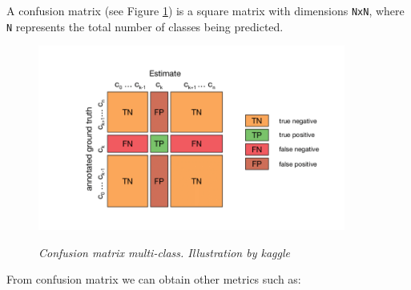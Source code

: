 A confusion matrix (see Figure \ref{fig:confusion-matrix}) is a square matrix
with dimensions {\tt NxN}, where {\tt N} represents the total number of classes being
predicted. \\

\begin{figure}[H]
  \begin{adjustbox}{trim={0pt 0.5cm 0pt 1cm}, clip}
    \centering
    \includegraphics[width=0.9\textwidth]{imatges/validation-strategy/confusion-matrix.png}
  \end{adjustbox}
  \caption[Confusion matrix multi-class]{\textit{Confusion matrix multi-class. Illustration by kaggle}}
  {\label{fig:confusion-matrix}}
\end{figure}

From confusion matrix we can obtain other metrics such as:

